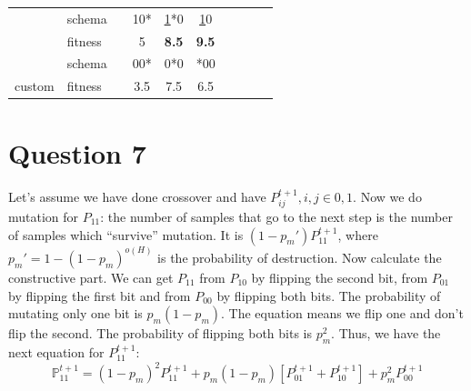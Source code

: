 \documentclass[12pt, a4paper]{article}
\begin{document}
\begin{table}[H]
\begin{tabular}{|l|l|c|ccc|ccc|c|}
            {\color[HTML]{000000} }                         & {\color[HTML]{000000} schema}  & {\color[HTML]{000000} }            & {\color[HTML]{000000} 10*}        & {\color[HTML]{000000} {\ul 1*0}}    & {\color[HTML]{000000} {\ul *10}}    & {\color[HTML]{000000} }           & {\color[HTML]{000000} }             & {\color[HTML]{000000} }             & {\color[HTML]{000000} }               \\
            {\color[HTML]{000000} }                         & {\color[HTML]{000000} fitness} & {\color[HTML]{000000} }            & {\color[HTML]{000000} 5}          & {\color[HTML]{000000} \textbf{8.5}} & {\color[HTML]{000000} \textbf{9.5}} & {\color[HTML]{000000} }           & {\color[HTML]{000000} }             & {\color[HTML]{000000} }             & {\color[HTML]{000000} }               \\ \cline{2-10}
            {\color[HTML]{000000} }                         & {\color[HTML]{000000} schema}  & {\color[HTML]{000000} }            & {\color[HTML]{000000} 00*}        & {\color[HTML]{000000} 0*0}          & {\color[HTML]{000000} *00}          & {\color[HTML]{000000} }           & {\color[HTML]{000000} }             & {\color[HTML]{000000} }             & {\color[HTML]{000000} }               \\
            \multirow{-8}{*}{{\color[HTML]{000000} custom}} & {\color[HTML]{000000} fitness} & {\color[HTML]{000000} }            & {\color[HTML]{000000} 3.5}        & {\color[HTML]{000000} 7.5}          & {\color[HTML]{000000} 6.5}          & {\color[HTML]{000000} }           & {\color[HTML]{000000} }             & {\color[HTML]{000000} }             & {\color[HTML]{000000} }               \\ \hline
            \end{tabular}
        \end{table}

    \section{Question 7}
        Let's assume we have done crossover and have $P_{ij}^{t+1}, i,j \in {0, 1}$.
        Now we do mutation for $P_{11}$: the number of samples that go to the next step
        is the number of samples which ``survive'' mutation. It is $(1 - p_m') P_{11}^{t+1}$,
        where $p_m' = 1 - (1 - p_m)^{o(H)}$ is the probability of destruction. Now
        calculate the constructive part. We can get $P_{11}$ from $P_{10}$ by flipping
        the second bit, from $P_{01}$ by flipping the first bit and from $P_{00}$ by
        flipping both bits. The probability of mutating only one bit is $p_m(1 - p_m)$.
        The equation means we flip one and don't flip the second. The probability of
        flipping both bits is $p_m^2$. Thus, we have the next equation for $P_{11}^{t+1}$:
        $$\mathbb{P}_{11}^{t+1} = (1 - p_m)^2 P_{11}^{t+1} + p_m(1 - p_m)[P_{01}^{t+1} + P_{10}^{t+1}] +
        p_m^2 P_{00}^{t+1}$$
\end{document}

